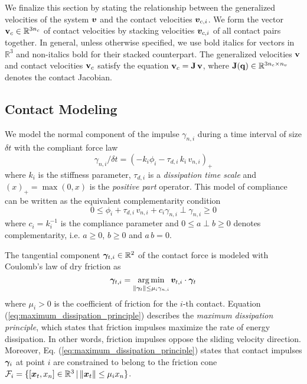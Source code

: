 We finalize this section by stating the relationship between the generalized
velocities of the system ${\bm{v}}$ and the contact velocities ${\bm{v}}_{c,i}$. We
form the vector ${\mathbf{v}}_{c}\in\mathbb{R}^{3n_c}$ of contact velocities by
stacking velocities ${\bm{v}}_{c,i}$ of all contact pairs together. In general,
unless otherwise specified, we use bold italics for vectors in $\mathbb{R}^3$
and non-italics bold for their stacked counterpart. The generalized velocities
${\mathbf{v}}$ and contact velocities ${\mathbf{v}}_c$ satisfy the equation
${\mathbf{v}}_c={\mathbf{J}}\,{\mathbf{v}}$, where ${\mathbf{J}}({\mathbf{q}})\in\mathbb{R}^{3n_c\times n_v}$
denotes the contact Jacobian.

\subsection{Contact Modeling}
We model the normal component of the impulse $\gamma_{n,i}$ during a time
interval of size $\delta t$ with the compliant force law
\begin{equation*}
    \gamma_{n,i}/\delta t = (-k_i\phi_i - \tau_{d,i}\,k_i\,v_{n,i})_+
\end{equation*}
where $k_i$ is the stiffness parameter, $\tau_{d,i}$ is a \textit{dissipation time
scale} and $(x)_+=\max(0, x)$ is the \textit{positive part} operator. This model
of compliance can be written as the equivalent complementarity condition
\begin{equation}
    0 \le \phi_i + \tau_{d,i}\,v_{n,i} + c_i \gamma_{n,i}\perp \gamma_{n,i} \ge 0
\end{equation}
where $c_i=k_i^{-1}$ is the compliance parameter and $0 \le a\perp b \ge 0$ denotes
complementarity, i.e. $a \ge 0$, $b \ge 0$ and $a\,b=0$.

The tangential component ${\bm\gamma}_{t,i}\in\mathbb{R}^2$ of the contact force is
modeled with Coulomb's law of dry friction as
\begin{equation}
    \bgamma_{t,i}=\argmin_{\Vert\bgamma_{t}\Vert\leq\mu_i\gamma_{n,i}}\vf{v}_{t,i}\cdot\bgamma_{t}
    \label{eq:maximum_dissipation_principle}
\end{equation}
where $\mu_i > 0$ is the coefficient of friction for the $i\text{-th}$ contact.
Equation (\ref{eq:maximum_dissipation_principle}) describes the \emph{maximum
dissipation principle}, which states that friction impulses maximize the rate of
energy dissipation. In other words, friction impulses oppose the sliding
velocity direction. Moreover, Eq. (\ref{eq:maximum_dissipation_principle})
states that contact impulses ${\bm\gamma}_i$ at point $i$ are constrained to belong
to the friction cone $\mathcal{F}_i=\{[{\bm{x}}_t, x_n] \in\mathbb{R}^3 \,|\,
\Vert{\bm{x}}_t\Vert\le \mu_i x_n\}$.

